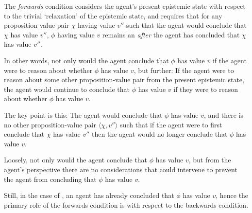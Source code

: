 \begin{note}[Forwards]
  The \emph{forwards} condition considers the agent's present epistemic state with respect to the trivial `relaxation' of the epistemic state, and requires that for any proposition-value pair \(\chi\) having value \(v''\) such that the agent would conclude that \(\chi\) has value \(v''\), \(\phi\) having value \(v\) remains an \sink{} \emph{after} the agent has concluded that \(\chi\) has value \(v''\).

  In other words, not only would the agent conclude that \(\phi\) has value \(v\) if the agent were to reason about whether \(\phi\) has value \(v\), but further:
  If the agent were to reason about some other proposition-value pair from the present epistemic state, the agent would continue to conclude that \(\phi\) has value \(v\) if they were to reason about whether \(\phi\) has value \(v\).

  The key point is this:
  The agent would conclude that \(\phi\) has value \(v\), and there is no other proposition-value pair \(\langle \chi, v'' \rangle\) such that if the agent were to first conclude that \(\chi\) has value \(v''\) then the agent would no longer conclude that \(\phi\) has value \(v\).

  Loosely, not only would the agent conclude that \(\phi\) has value \(v\), but from the agent's perspective there are no considerations that could intervene to prevent the agent from concluding that \(\phi\) has value \(v\).

  Still, in the case of \ideaS{}, an agent has already concluded that \(\phi\) has value \(v\), hence the primary role of the forwards condition is with respect to the backwards condition.
\end{note}


